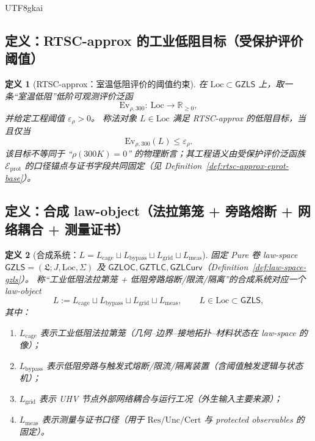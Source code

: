 \documentclass[12pt]{article}
\newtheorem{definition}{定义}[section]
\newcommand{\GZLS}{\ensuremath{\mathsf{GZLS}}}
\newcommand{\GZLOC}{\ensuremath{\mathsf{GZLOC}}}
\newcommand{\GZLCurv}{\ensuremath{\mathsf{GZLCurv}}}
\newcommand{\GZTLC}{\ensuremath{\mathsf{GZTLC}}}
\begin{document}
\begin{CJK*}{UTF8}{gkai}
\subsection{定义：\textsf{RTSC-approx} 的工业低阻目标（受保护评价阈值）}

\begin{definition}[\textsf{RTSC-approx}：室温低阻评价的阈值约束]
\label{def:rtsc-approx-goal}
在 $\mathrm{Loc}\subset\GZLS$ 上，取一条“室温低阻”低阶可观测评价泛函
\[
\mathrm{Ev}_{\rho,300}:\ \mathrm{Loc}\to \mathbb{R}_{\ge 0},
\]
并给定工程阈值 $\varepsilon_{\rho}>0$。
称法对象 $L\in\mathrm{Loc}$ 满足 \textsf{RTSC-approx} 的低阻目标，当且仅当
\[
\mathrm{Ev}_{\rho,300}(L)\le \varepsilon_{\rho}.
\]
该目标不等同于 ``$\rho(300K)=0$'' 的物理断言；其工程语义由受保护评价泛函族 $\mathcal{E}_{\mathrm{prot}}$ 的口径锚点与证书字段共同固定（见 Definition~\ref{def:rtsc-approx-eprot-base}）。
\end{definition}

\subsection{定义：合成 law-object（法拉第笼 + 旁路熔断 + 网络耦合 + 测量证书）}

\begin{definition}[合成系统：$L=L_{\mathrm{cage}}\sqcup L_{\mathrm{bypass}}\sqcup L_{\mathrm{grid}}\sqcup L_{\mathrm{meas}}$]
\label{def:rtsc-approx-composite-law-object}
固定 Pure 卷 law-space $\GZLS=(\mathfrak{L};J,\mathrm{Loc},\Sigma)$ 及 $\GZLOC,\GZTLC,\GZLCurv$（Definition~\ref{def:law-space-gzls}）。
称“工业低阻法拉第笼 + 低阻旁路熔断/限流/隔离”的合成系统对应一个 law-object
\[
L
:=
L_{\mathrm{cage}}
\sqcup
L_{\mathrm{bypass}}
\sqcup
L_{\mathrm{grid}}
\sqcup
L_{\mathrm{meas}},
\qquad
L\in\mathrm{Loc}\subset\GZLS,
\]
其中：
\begin{enumerate}
  \item $L_{\mathrm{cage}}$ 表示工业低阻法拉第笼（几何--边界--接地拓扑--材料状态在 law-space 的像）；
  \item $L_{\mathrm{bypass}}$ 表示低阻旁路与触发式熔断/限流/隔离装置（含阈值触发逻辑与状态机）；
  \item $L_{\mathrm{grid}}$ 表示 UHV 节点外部网络耦合与运行工况（外生输入主要来源）；
  \item $L_{\mathrm{meas}}$ 表示测量与证书口径（用于 $\mathrm{Res}/\mathrm{Unc}/\mathrm{Cert}$ 与 protected observables 的固定）。
\end{enumerate}
\end{definition}


\end{CJK*}
\end{document}
